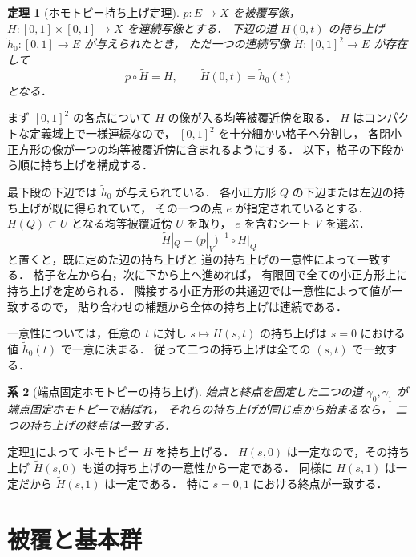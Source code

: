\documentclass[a5paper,10pt,onecolumn]{jsarticle}
\makeatletter
\theoremstyle{mathnotetheorem}
\newtheorem{theorem}{定理}[section]
\newtheorem{corollary}[theorem]{系}
\renewcommand{\proofname}{証明}
\renewenvironment{proof}[1][\proofname]{%
  \par\pushQED{\qed}\normalfont\topsep4\p@\@plus2\p@\relax
  \trivlist\item[\hskip\labelsep\bfseries #1]\ignorespaces
}{\popQED\endtrivlist\@endpefalse}
\makeatother
\begin{document}
\begin{theorem}[ホモトピー持ち上げ定理]\label{thm:homotopy-lift}
$p:E\to X$ を被覆写像，
$H:[0,1]\times[0,1]\to X$ を連続写像とする．
下辺の道 $H(0,t)$ の持ち上げ
$\widetilde h_0:[0,1]\to E$ が与えられたとき，
ただ一つの連続写像
$\widetilde H:[0,1]^2\to E$ が存在して
\[
 p\circ\widetilde H=H,\qquad
 \widetilde H(0,t)=\widetilde h_0(t)
\]
となる．
\end{theorem}
\begin{proof}
まず $[0,1]^2$ の各点について
$H$ の像が入る均等被覆近傍を取る．
$H$ はコンパクトな定義域上で一様連続なので，
$[0,1]^2$ を十分細かい格子へ分割し，
各閉小正方形の像が一つの均等被覆近傍に含まれるようにする．
以下，格子の下段から順に持ち上げを構成する．

最下段の下辺では $\widetilde h_0$ が与えられている．
各小正方形 $Q$ の下辺または左辺の持ち上げが既に得られていて，
その一つの点 $e$ が指定されているとする．
$H(Q)\subset U$ となる均等被覆近傍 $U$ を取り，
$e$ を含むシート $V$ を選ぶ．
\[
 \widetilde H|_Q=(p|_V)^{-1}\circ H|_Q
\]
と置くと，既に定めた辺の持ち上げと
道の持ち上げの一意性によって一致する．
格子を左から右，次に下から上へ進めれば，
有限回で全ての小正方形上に持ち上げを定められる．
隣接する小正方形の共通辺では一意性によって値が一致するので，
貼り合わせの補題から全体の持ち上げは連続である．

一意性については，任意の $t$ に対し
$s\mapsto H(s,t)$ の持ち上げは
$s=0$ における値 $\widetilde h_0(t)$ で一意に決まる．
従って二つの持ち上げは全ての $(s,t)$ で一致する．
\end{proof}

\begin{corollary}[端点固定ホモトピーの持ち上げ]\label{cor:homotopy-end}
始点と終点を固定した二つの道
$\gamma_0,\gamma_1$ が端点固定ホモトピーで結ばれ，
それらの持ち上げが同じ点から始まるなら，
二つの持ち上げの終点は一致する．
\end{corollary}
\begin{proof}
定理\ref{thm:homotopy-lift}によって
ホモトピー $H$ を持ち上げる．
$H(s,0)$ は一定なので，その持ち上げ
$\widetilde H(s,0)$ も道の持ち上げの一意性から一定である．
同様に $H(s,1)$ は一定だから
$\widetilde H(s,1)$ は一定である．
特に $s=0,1$ における終点が一致する．
\end{proof}

\section{被覆と基本群}
\end{document}
